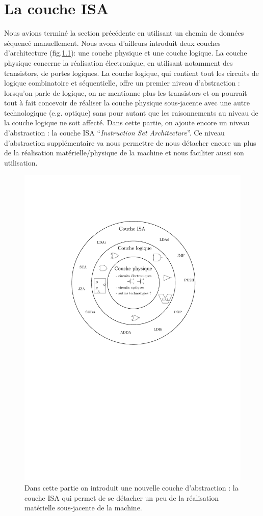 \chapter{La couche ISA}



Nous avions terminé la section précédente en utilisant un chemin de données séquencé manuellement. Nous avons d'ailleurs introduit deux couches d'architecture (fig.\ref{fig:couches_architecture}): une couche physique et une couche logique. La couche physique concerne la réalisation électronique, en utilisant notamment des transistors, de portes logiques. La couche logique, qui contient tout les circuits de logique combinatoire et séquentielle, offre un premier niveau d'abstraction : lorsqu'on parle de logique, on ne mentionne plus les transistors et on pourrait tout à fait concevoir de réaliser la couche physique sous-jacente avec une autre technologique (e.g. optique) sans pour autant que les raisonnements au niveau de la couche logique ne soit affecté. Dans cette partie, on ajoute encore un niveau d'abstraction : la couche ISA ``\emph{Instruction Set Architecture}''. Ce niveau d'abstraction supplémentaire va nous permettre de nous détacher encore un plus de la réalisation matérielle/physique de la machine et nous faciliter aussi son utilisation.

\begin{figure}[htbp]
\centering\includegraphics[width=0.6\linewidth]{Figs/couches_architecture.pdf}
\caption{\label{fig:couches_architecture} Dans cette partie on introduit une nouvelle couche d'abstraction : la couche ISA qui permet de se détacher un peu de la réalisation matérielle sous-jacente de la machine.}
\end{figure}


